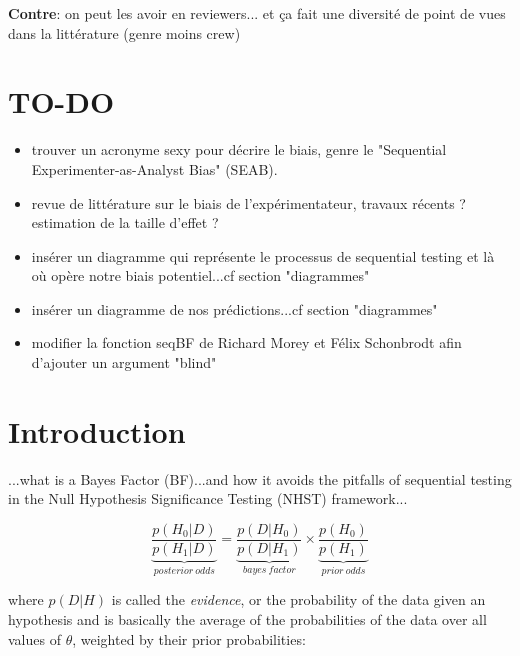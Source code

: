 \documentclass[a4paper,man,natbib,floatsintext]{apa6}
\begin{document}
\textbf{Contre}: on peut les avoir en reviewers... et ça fait une diversité de point de vues dans la littérature (genre moins crew)

\section{TO-DO}

\begin{itemize}

\item{trouver un acronyme sexy pour décrire le biais, genre le "Sequential Experimenter-as-Analyst Bias" (SEAB).} 

\item{revue de littérature sur le biais de l'expérimentateur, travaux récents ? estimation de la taille d'effet ?}

\item{insérer un diagramme qui représente le processus de sequential testing et là où opère notre biais potentiel...cf section "diagrammes"}

\item{insérer un diagramme de nos prédictions...cf section "diagrammes"}

\item{modifier la fonction seqBF de Richard Morey et Félix Schonbrodt afin d'ajouter un argument "blind"} 

\end{itemize}

\section{Introduction}

...what is a Bayes Factor (BF)...and how it avoids the pitfalls of sequential testing  in the Null Hypothesis Significance Testing (NHST) framework...

\begin{equation}
\underbrace{\dfrac{p(H_{0}|D)}{p(H_{1}|D)}}_{posterior\ odds} = \underbrace{\dfrac{p(D|H_{0})}{p(D|H_{1})}}_{bayes\ factor} \times \underbrace{\dfrac{p(H_{0})}{p(H_{1})}}_{prior\ odds}
\end{equation}

\vspace{5mm}

where $p(D|H)$ is called the \emph{evidence}, or the probability of the data given an hypothesis and is basically the average of the probabilities of the data over all values of $\theta$, weighted by their prior probabilities:
\end{document}
